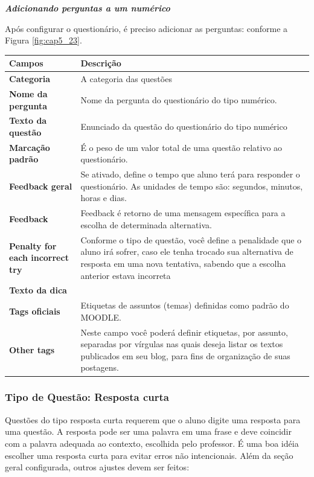  \textit{\textbf{Adicionando perguntas a um numérico}}

Após configurar o questionário, é preciso adicionar as perguntas: conforme a Figura \ref{fig:cap5_23}.

\begin{longtable}{p{6cm}|p{9cm}}
     \hline
     \rowcolor[rgb]{0.8,0.8,0.8} \textbf{Campos} &  \textbf{Descrição}\\\hline
    \textbf{Categoria} & A categoria das questões \\\hline
    \textbf{Nome da pergunta} & Nome da pergunta do questionário do tipo numérico. \\\hline
    \textbf{Texto da questão} & Enunciado da questão do questionário do tipo numérico \\\hline
    \textbf{Marcação padrão} & É o peso de um valor total de uma questão relativo ao questionário. \\\hline
    \textbf{Feedback geral} &  Se ativado, define o tempo que aluno terá para responder o questionário. As unidades de tempo são: segundos, minutos, horas e dias. \\\hline
    \textbf{Feedback} & Feedback é retorno de uma mensagem específica para a escolha de determinada alternativa. \\\hline
    \textbf{Penalty for each incorrect try  } &  Conforme o tipo de questão, você define a  penalidade que o aluno irá sofrer, caso ele tenha trocado sua  alternativa de resposta em uma nova tentativa, sabendo que a escolha anterior estava incorreta \\\hline
    \textbf{Texto da dica} &         \\\hline
    \textbf{Tags oficiais} &  Etiquetas de assuntos (temas) definidas como padrão do MOODLE. \\\hline
    \textbf{Other tags} & Neste campo você poderá definir  etiquetas,  por assunto, separadas por vírgulas nas quais deseja listar os textos publicados em seu blog, para fins de organização de suas postagens. \\\hline
\end{longtable}%

\subsubsection{Tipo de Questão: Resposta curta}
Questões do tipo resposta curta requerem que o aluno digite uma resposta para uma questão. A resposta pode ser uma palavra em uma frase e deve coincidir com a palavra adequada ao contexto, escolhida pelo professor. É uma boa idéia escolher uma resposta curta para evitar erros não intencionais. Além da seção geral configurada, outros ajustes devem ser feitos:

